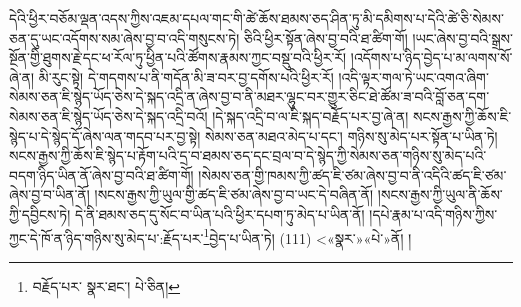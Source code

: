 དེའི་ཕྱིར་བཅོམ་ལྡན་འདས་ཀྱིས་འཇམ་དཔལ་གང་གི་ཚེ་ཆོས་ཐམས་ཅད་ཤིན་ཏུ་མི་དམིགས་པ་དེའི་ཚེ་ཅི་སེམས་ཅན་དུ་ཡང་འདོགས་སམ་ཞེས་བྱ་བ་འདི་གསུངས་ཏེ། ཅིའི་ཕྱིར་སྟོན་ཞེས་བྱ་བའི་ཐ་ཚིག་གོ། །ཡང་ཞེས་བྱ་བའི་སྒྲས་སྔོན་གྱི་ཐུགས་རྗེ་དང་ཕ་རོལ་ཏུ་ཕྱིན་པའི་ཚོགས་རྣམས་ཀྱང་བསྡུ་བའི་ཕྱིར་རོ། །འདོགས་པ་ཉིད་བྱེད་པ་མ་ལགས་སོ་ཞེ་ན། མི་རུང་སྟེ། དེ་གདགས་པ་ནི་གདོན་མི་ཟ་བར་བྱ་དགོས་པའི་ཕྱིར་རོ། །འདི་ལྟར་གལ་ཏེ་ཡང་འགའ་ཞིག་སེམས་ཅན་ཇི་སྙེད་ཡོད་ཅེས་དེ་སྐད་འདྲི་ན་ཞེས་བྱ་བ་ནི་མཐར་ལྷུང་བར་གྱུར་ཅིང་ཐེ་ཚོམ་ཟ་བའི་བློ་ཅན་དག་སེམས་ཅན་ཇི་སྙེད་ཡོད་ཅེས་དེ་སྐད་འདྲི་བའོ། །དེ་སྐད་འདྲི་བ་ལ་ཇི་སྐད་བརྗོད་པར་བྱ་ཞེ་ན། སངས་རྒྱས་ཀྱི་ཆོས་ཇི་སྙེད་པ་དེ་སྙེད་དོ་ཞེས་ལན་གདབ་པར་བྱ་སྟེ། སེམས་ཅན་མཐའ་མེད་པ་དང་། གཉིས་སུ་མེད་པར་སྟོན་པ་ཡིན་ཏེ། སངས་རྒྱས་ཀྱི་ཆོས་ཇི་སྙེད་པ་རྟོག་པའི་དྲ་བ་ཐམས་ཅད་དང་བྲལ་བ་དེ་སྙེད་ཀྱི་སེམས་ཅན་གཉིས་སུ་མེད་པའི་བདག་ཉིད་ཡིན་ནོ་ཞེས་བྱ་བའི་ཐ་ཚིག་གོ། །སེམས་ཅན་གྱི་ཁམས་ཀྱི་ཚད་ཇི་ཙམ་ཞེས་བྱ་བ་ནི་འདིའི་ཚད་ཇི་ཙམ་ཞེས་བྱ་བ་ཡིན་ནོ། །སངས་རྒྱས་ཀྱི་ཡུལ་གྱི་ཚད་ཇི་ཙམ་ཞེས་བྱ་བ་ཡང་དེ་བཞིན་ནོ། །སངས་རྒྱས་ཀྱི་ཡུལ་ནི་ཆོས་ཀྱི་དབྱིངས་ཏེ། དེ་ནི་ཐམས་ཅད་དུ་སོང་བ་ཡིན་པའི་ཕྱིར་དཔག་ཏུ་མེད་པ་ཡིན་ནོ། །དཔེ་རྣམ་པ་འདི་གཉིས་ཀྱིས་ཀྱང་དེ་ཁོ་ན་ཉིད་གཉིས་སུ་མེད་པ་:རྗོད་པར་\footnote{བརྗོད་པར་  སྣར་ཐང་།  པེ་ཅིན། }བྱེད་པ་ཡིན་ཏེ། (111) <«སྣར་»«པེ་»ནོ། །
